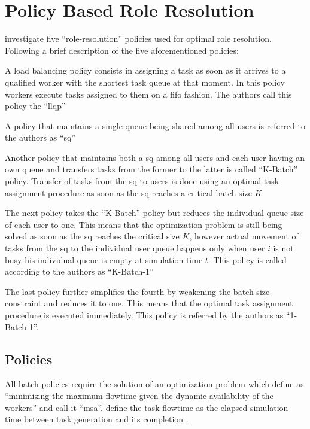 \chapter{Policy Based Role Resolution}
\label{ch:policies}

\citet[p. 7]{Zeng2005} investigate five ``role-resolution'' policies used for optimal role resolution. Following a brief description of the five aforementioned policies:
\begin{enumerate*}
	\item A load balancing policy consists in assigning a task as soon as it arrives to a qualified worker with the shortest task queue at that moment. In this policy workers execute tasks assigned to them on a \gls{fifo} fashion. The authors call this policy the ``\gls{llqp}''
	\item A policy that maintains a single queue being shared among all users is referred to the authors as ``\gls{sq}''
	\item Another policy that maintains both a \gls{sq} among all users and each user having an own queue and transfers tasks from the former to the latter is called ``K-Batch'' policy. Transfer of tasks from the \gls{sq} to users is done using an optimal task assignment procedure as soon as the \gls{sq} reaches a critical batch size $K$
	\item The next policy takes the ``K-Batch'' policy but reduces the individual queue size of each user to one. This means that the optimization problem is still being solved as soon as the \gls{sq} reaches the critical size $K$, however actual movement of tasks from the \gls{sq} to the individual user queue happens only when user $i$ is not busy \ie his individual queue is empty at simulation time $t$. This policy is called according to the authors as ``K-Batch-1''
	\item The last policy further simplifies the fourth by weakening the batch size constraint and reduces it to one. This means that the optimal task assignment procedure is executed immediately. This policy is referred by the authors as ``1-Batch-1''.
\end{enumerate*}

\section{ Policies}
\label{sec:opt_policies}

All batch policies require the solution of an optimization problem which \citet{Zeng2005} define as ``minimizing the maximum flowtime given the dynamic availability of the workers'' and call it ``\gls{msa}''\citep[p. 7]{Zeng2005}. \citet{Zeng2005} define the task flowtime as the elapsed simulation time between task generation and its completion \citep{Zeng2005,Baker1974}. 

